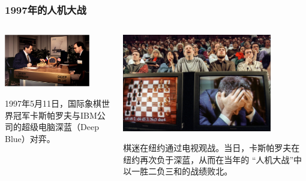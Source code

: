 \begin{frame}[fragile]
  \frametitle{1997年的人机大战}

  \begin{columns}
    \begin{column}[T]{.5\linewidth}
      \includegraphics[width=0.8\textwidth]{figs/intro/deep_blue_1.png}

        1997年5月11日，国际象棋世界冠军卡斯帕罗夫与IBM公司的超级电脑深蓝（Deep Blue）对弈。
    \end{column}
    \begin{column}[T]{.5\linewidth}
      \includegraphics[width=0.8\textwidth]{figs/intro/deep_blue_2.png}

      棋迷在纽约通过电视观战。当日，卡斯帕罗夫在纽约再次负于深蓝，从而在当年的
      “人机大战”中以一胜二负三和的战绩败北。
    \end{column}
  \end{columns}
\end{frame}

